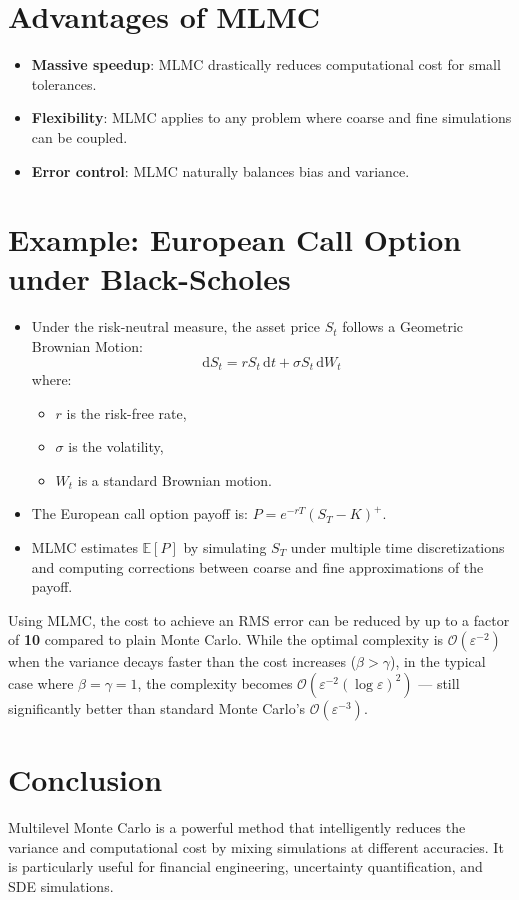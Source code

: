 \documentclass{article}
\begin{document}
\section{Advantages of MLMC}
\begin{itemize}
  \item \textbf{Massive speedup}: MLMC drastically reduces computational cost for small tolerances.
  \item \textbf{Flexibility}: MLMC applies to any problem where coarse and fine simulations can be coupled.
  \item \textbf{Error control}: MLMC naturally balances bias and variance.
\end{itemize}

\section{Example: European Call Option under Black-Scholes}
\begin{itemize}
  \item Under the risk-neutral measure, the asset price $S_t$ follows a Geometric Brownian Motion:
  \begin{equation}
  \mathrm{d}S_t = r S_t \,\mathrm{d}t + \sigma S_t \,\mathrm{d}W_t
  \end{equation}
  where:
  \begin{itemize}
    \item $r$ is the risk-free rate,
    \item $\sigma$ is the volatility,
    \item $W_t$ is a standard Brownian motion.
  \end{itemize}

  \item The European call option payoff is: $P = e^{-rT} (S_T - K)^+$.

  \item MLMC estimates $\mathbb{E}[P]$ by simulating $S_T$ under multiple time discretizations and computing corrections between coarse and fine approximations of the payoff.
\end{itemize}

Using MLMC, the cost to achieve an RMS error can be reduced by up to a factor of \textbf{10} compared to plain Monte Carlo. While the optimal complexity is $\mathcal{O}(\varepsilon^{-2})$ when the variance decays faster than the cost increases ($\beta > \gamma$), in the typical case where $\beta = \gamma = 1$, the complexity becomes $\mathcal{O}(\varepsilon^{-2} (\log \varepsilon)^2)$ — still significantly better than standard Monte Carlo’s $\mathcal{O}(\varepsilon^{-3})$.

\section{Conclusion}
Multilevel Monte Carlo is a powerful method that intelligently reduces the variance and computational cost by mixing simulations at different accuracies.\newline
It is particularly useful for financial engineering, uncertainty quantification, and SDE simulations.
\end{document}
